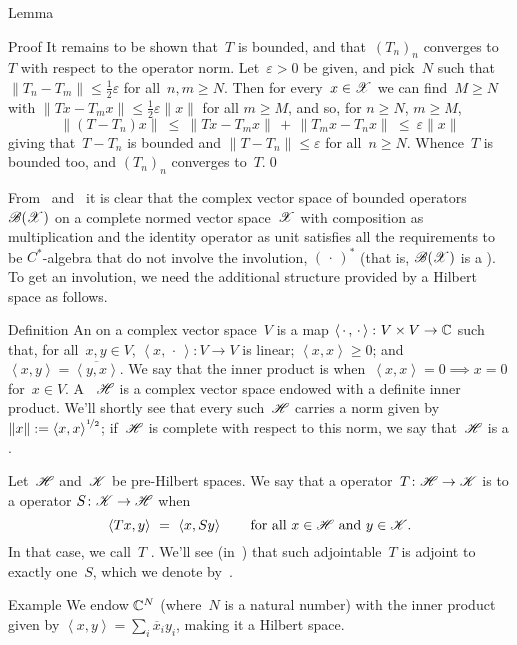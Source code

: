 \documentclass[a]{subfiles}
\begin{document}
\begin{parsec}[hilb]
\begin{point}{Lemma}
\begin{point}{Proof}
It remains to be shown that~$T$ is bounded,
and that~$(T_n)_n$ converges to~$T$ with respect to the operator norm.
Let~$\varepsilon>0$ be given, and pick~$N$ such that
$\|T_n-T_m\|\leq \frac{1}{2}\varepsilon$ for all~$n,m\geq N$.
Then for every~$x\in \mathscr{X}$
we can find~$M\geq N$ with 
$\|T x - T_m x\|\leq \frac{1}{2}\varepsilon\|x\|$ for all $m\geq M$,
and so,
for $n\geq N$, $m\geq M$,
\begin{equation*}
\|(T - T_n) x\| \ \leq\ \|T x - T_mx\|\,+\,\|T_m x - T_n x\|
\ \leq\  \varepsilon\|x\|
\end{equation*}
giving that~$T-T_n$ is bounded
and $\|T-T_n\|\leq \varepsilon$ for all~$n\geq N$.
Whence~$T$ is bounded too,
and $(T_n)_n$ converges to~$T$.\qed
\end{point}
\end{point}
\begin{point}%
From~
and~
it is clear that the complex vector space
of bounded operators~$\mathscr{B}(\mathscr{X})$
on a complete normed vector space~$\mathscr{X}$
with composition as multiplication
and the identity operator as unit
satisfies all the requirements
to be $C^*$-algebra that do not involve the involution, $(\,\cdot\,)^*$
(that is, $\mathscr{B}(\mathscr{X})$ is a ).
To get an involution,
we need the additional structure
provided by a Hilbert space as follows.
\end{point}
\begin{point}{Definition}%
An 
on a complex vector space~$V$ 
is a map $\left<\,\cdot\,,\,\cdot\,\right>\colon V\times V\to \mathbb{C}$
such that,
for all~$x,y\in V$,
$\left<x,\,\cdot\,\right>\colon V\to V$ is linear;
$\left<x,x\right>\geq 0$;
and
$\left<x,y\right>=\overline{\left<y,x\right>}$.
We say that the inner product is 
when~$\left<x,x\right>=0\implies x=0$ for~$x\in V$.
A ~$\mathscr{H}$
is a complex vector space endowed with a definite inner product.
We'll shortly see that every such~$\mathscr{H}$
carries a norm
given by
 $\|x\|:= \left<x,x\right>^{\nicefrac{1}{2}}$;
if~$\mathscr{H}$ is complete with respect to this norm,
we say that~$\mathscr{H}$ is a .

Let~$\mathscr{H}$ and~$\mathscr{K}$ be pre-Hilbert spaces.
We say that a operator~$T\colon \mathscr{H}\to \mathscr{K}$
is 
to a operator
$S\colon \mathscr{K}\to \mathscr{H}$ 
when
\begin{equation*}
\left<Tx,y\right> \ = \ \left<x,Sy\right>
\qquad\text{for all $x\in \scrH$ and $y\in \scrK$.}
\end{equation*}
In that case, we call~$T$ .
We'll see (in~)
that such adjointable~$T$ is adjoint to exactly one~$S$,
which we denote by~.
\end{point}
\begin{point}{Example}%
We endow $\mathbb{C}^N$
(where~$N$ is a natural number)
with the inner product
given by
$\left<x,y\right>=\sum_i \overline{x}_iy_i$,
making it a Hilbert space.


\end{point}
\end{parsec}
\end{document}
